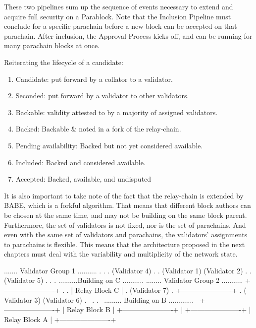 These two pipelines sum up the sequence of events necessary to extend and
acquire full security on a Parablock. Note that the Inclusion Pipeline must
conclude for a specific parachain before a new block can be accepted on that
parachain. After inclusion, the Approval Process kicks off, and can be running
for many parachain blocks at once.
\newline

Reiterating the lifecycle of a candidate:

\begin{enumerate}
    \item Candidate: put forward by a collator to a validator.
    \item Seconded: put forward by a validator to other validators.
    \item Backable: validity attested to by a majority of assigned validators.
    \item Backed: Backable \& noted in a fork of the relay-chain.
    \item Pending availability: Backed but not yet considered available.
    \item Included: Backed and considered available.
    \item Accepted: Backed, available, and undisputed
\end{enumerate}


It is also important to take note of the fact that the relay-chain is extended
by BABE, which is a forkful algorithm. That means that different block authors
can be chosen at the same time, and may not be building on the same block
parent. Furthermore, the set of validators is not fixed, nor is the set of
parachains. And even with the same set of validators and parachains, the
validators' assignments to parachains is flexible. This means that the
architecture proposed in the next chapters must deal with the variability and
multiplicity of the network state.

\begin{verbnobox}[\small]
....... Validator Group 1 ..........
.                                  .
.         (Validator 4)            .
.  (Validator 1) (Validator 2)     .
.         (Validator 5)            .
.                                  .
..........Building on C  ...........        ........ Validator Group 2 ...........
        +----------------------+           .                                    .
        |    Relay Block C     |           .           (Validator 7)            .
        +----------------------+           .    ( Validator 3) (Validator 6)    .
                        \                  .                                    .
                         \                 ......... Building on B  .............
                          \
                    +----------------------+
                    |  Relay Block B       |
                    +----------------------+
                                |
                    +----------------------+
                    |  Relay Block A       |
                    +----------------------+
\end{verbnobox}

